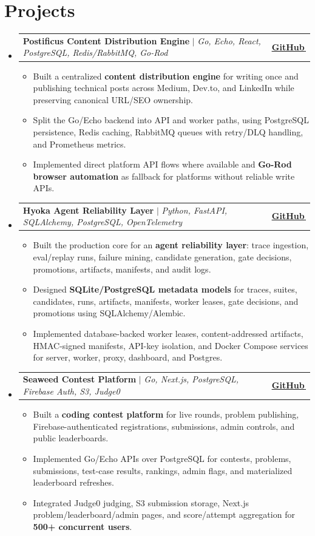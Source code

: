 \documentclass[letterpaper,11pt]{article}
\makeatletter
\newcommand{\bodyhref}[2]{\href{#1}{\underline{#2}\,\faExternalLink*}}
\newcommand{\resumeItem}[1]{\item{\fontsize{8.82pt}{9.28pt}\selectfont #1\vspace{-0.7pt}}}
\newcommand{\resumeProjectHeading}[2]{
    \item
    \begin{tabular*}{1.0\textwidth}{l@{\extracolsep{\fill}}r}
      \small#1 & \textbf{\small #2}\\
    \end{tabular*}\vspace{-4pt}
}
\newcommand{\resumeSubHeadingListStart}{\begin{itemize}[leftmargin=0.0in, label={}, itemsep=0.6pt, topsep=0pt, parsep=0pt, partopsep=0pt]}
\newcommand{\resumeSubHeadingListEnd}{\end{itemize}}
\newcommand{\resumeItemListStart}{\begin{itemize}[leftmargin=0.16in,itemsep=0.3pt,topsep=0.9pt,parsep=0pt,partopsep=0pt]}
\newcommand{\resumeItemListEnd}{\end{itemize}\vspace{-3pt}}
\makeatother
\begin{document}
\section{Projects}
\resumeSubHeadingListStart
\resumeProjectHeading
{\textbf{Postificus Content Distribution Engine} $|$ \emph{Go, Echo, React, PostgreSQL, Redis/RabbitMQ, Go-Rod}}{\bodyhref{https://github.com/unichronic/postificus}{GitHub}}
\resumeItemListStart
\resumeItem{Built a centralized \textbf{content distribution engine} for writing once and publishing technical posts across Medium, Dev.to, and LinkedIn while preserving canonical URL/SEO ownership.}
\resumeItem{Split the Go/Echo backend into API and worker paths, using PostgreSQL persistence, Redis caching, RabbitMQ queues with retry/DLQ handling, and Prometheus metrics.}
\resumeItem{Implemented direct platform API flows where available and \textbf{Go-Rod browser automation} as fallback for platforms without reliable write APIs.}
\resumeItemListEnd
\resumeProjectHeading
{\textbf{Hyoka Agent Reliability Layer} $|$ \emph{Python, FastAPI, SQLAlchemy, PostgreSQL, OpenTelemetry}}{\bodyhref{https://github.com/unichronic/hyoka}{GitHub}}
\resumeItemListStart
\resumeItem{Built the production core for an \textbf{agent reliability layer}: trace ingestion, eval/replay runs, failure mining, candidate generation, gate decisions, promotions, artifacts, manifests, and audit logs.}
\resumeItem{Designed \textbf{SQLite/PostgreSQL metadata models} for traces, suites, candidates, runs, artifacts, manifests, worker leases, gate decisions, and promotions using SQLAlchemy/Alembic.}
\resumeItem{Implemented database-backed worker leases, content-addressed artifacts, HMAC-signed manifests, API-key isolation, and Docker Compose services for server, worker, proxy, dashboard, and Postgres.}
\resumeItemListEnd
\resumeProjectHeading
{\textbf{Seaweed Contest Platform} $|$ \emph{Go, Next.js, PostgreSQL, Firebase Auth, S3, Judge0}}{\bodyhref{https://github.com/unichronic/seaweed-fe}{GitHub}}
\resumeItemListStart
\resumeItem{Built a \textbf{coding contest platform} for live rounds, problem publishing, Firebase-authenticated registrations, submissions, admin controls, and public leaderboards.}
\resumeItem{Implemented Go/Echo APIs over PostgreSQL for contests, problems, submissions, test-case results, rankings, admin flags, and materialized leaderboard refreshes.}
\resumeItem{Integrated Judge0 judging, S3 submission storage, Next.js problem/leaderboard/admin pages, and score/attempt aggregation for \textbf{500+ concurrent users}.}
\resumeItemListEnd
\resumeSubHeadingListEnd
\end{document}
